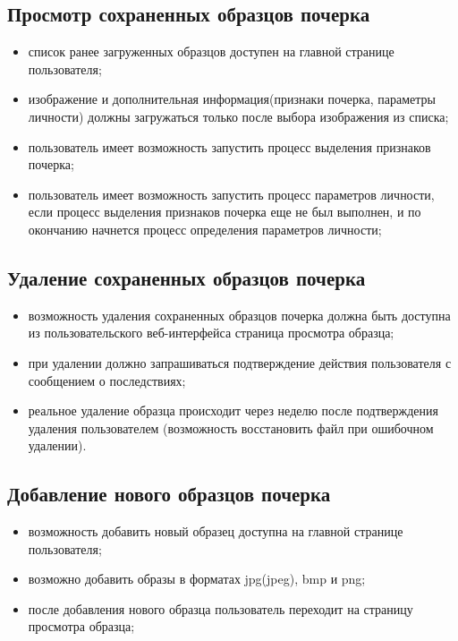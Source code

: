 \subsection{Просмотр сохраненных образцов почерка}
\label{sec:freq:show}
\begin{itemize}
	\item список ранее загруженных образцов доступен на главной странице пользователя;
	\item изображение и дополнительная информация(признаки почерка, параметры личности) должны загружаться только после выбора изображения из списка;
	\item пользователь имеет возможность запустить процесс выделения признаков почерка;
	\item пользователь имеет возможность запустить процесс параметров личности, если процесс выделения признаков почерка еще не был выполнен, и по окончанию начнется процесс определения параметров личности;
\end{itemize}

\subsection{Удаление сохраненных образцов почерка}
\label{sec:freq:delete}
\begin{itemize}
	\item возможность удаления сохраненных образцов почерка должна быть доступна из пользовательского веб-интерфейса страница просмотра образца;
	\item при удалении должно запрашиваться подтверждение действия пользователя с сообщением о последствиях;
	\item реальное удаление образца происходит через неделю после подтверждения удаления пользователем (возможность восстановить файл при ошибочном удалении).
\end{itemize}

\subsection{Добавление нового образцов почерка}
\label{sec:freq:add}
\begin{itemize}
	\item возможность добавить новый образец доступна на главной странице пользователя;
	\item возможно добавить образы в форматах jpg(jpeg), bmp и png;
	\item после добавления нового образца пользователь переходит на страницу просмотра образца;
\end{itemize}

